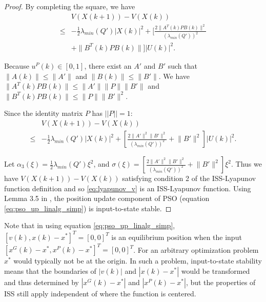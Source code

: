 \begin{mythm}
\begin{proof}
By completing the square, we have
\begin{equation}
\label{eq:lyapunov_delta4}
\begin{aligned}
& V( X(k+1) ) - V( X(k) ) \\
\leq & - \frac{1}{2} \lambda_{min}(Q') | X(k) |^{2} + [ \frac{2 \lVert A^{T}(k) P B(k) \rVert^{2}}{ ( \lambda_{min}(Q') )^{2} }  \\
& + \lVert B^{T}(k) P B(k) \rVert ] | U(k) |^{2}. 
\end{aligned}
\end{equation}

Because $ u^{P}(k) \in [0, 1] $, there exist an $ A' $ and $ B' $ such that $ \lVert A(k) \rVert \leq \lVert A' \rVert $ and $ \lVert B(k) \rVert \leq \lVert B' \rVert $.
We have $ \lVert A^{T}(k) P B(k) \rVert \leq \lVert A' \rVert \lVert P \rVert \lVert B' \rVert $ and $ \lVert B^{T}(k) P B(k) \rVert \leq \lVert P \rVert \lVert B' \rVert^{2} $.

Since the identity matrix $ P $ has $ || P || = 1 $:
\begin{equation}
\label{eq:lyapunov_delta5}
\begin{aligned}
& V( X(k+1) ) - V( X(k) ) \\
\leq & - \frac{1}{2} \lambda_{min}(Q') | X(k) |^{2} + [ \frac{2 \lVert A' \rVert^{2} \lVert B' \rVert^{2}}{ ( \lambda_{min}(Q') )^{2} } + \lVert B' \rVert^{2} ] | U(k) |^{2}.
\end{aligned}
\end{equation}

Let
$ \alpha_{3} ( \xi )= \frac{1}{2} \lambda_{min}(Q') \xi^{2} $,
and
$ \sigma ( \xi ) = [ \frac{2 \lVert A' \rVert^{2} \lVert B' \rVert^{2}}{ ( \lambda_{min}(Q') )^{2} } +  \lVert B' \rVert^{2} ] \xi^{2} $.
Thus we have $  V( X(k+1) ) - V( X(k) ) $ satisfying condition 2 of the ISS-Lyapunov function definition and
so \eqref{eq:lyapunov_v} is an ISS-Lyapunov function.
Using Lemma 3.5 in \cite{Jiang2001857}, the position update component of PSO (equation \eqref{eq:pso_up_linalg_simp}) is input-to-state stable.

\end{proof}
\end{mythm}

Note that in using equation \eqref{eq:pso_up_linalg_simp},
$ [ v(k), x(k) - x^{*} ]^{T} = [0, 0]^{T} $ is an equilibrium position when the input $ [ x^{G}(k) - x^{*} , x^{P}(k) - x^{*} ]^{T} = [0, 0]^{T} $.
For an arbitrary optimization problem $ x^{*} $ would typically not be at the origin. 
In such a problem, input-to-state stability means that the boundaries of $ | v(k) | $ and $ | x(k) - x^{*} | $ would be transformed and thus determined by $ | x^{G}(k) - x^{*} | $ and $ | x^{P}(k) - x^{*} | $,
but the properties of ISS still apply independent of where the function is centered.

